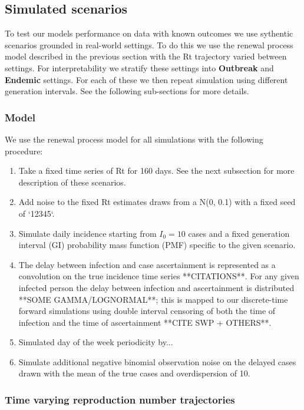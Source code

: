 \documentclass{getwriting}
\begin{document}
\subsection{Simulated scenarios}

To test our models performance on data with known outcomes we use sythentic scenarios grounded in real-world settings. To do this we use the renewal process model described in the previous section with the Rt trajectory varied between settings. For interpretability we stratify these settings into \textbf{Outbreak} and \textbf{Endemic} settings. For each of these we then repeat simulation using different generation intervals. See the following sub-sections for more details.

\subsubsection{Model}

We use the renewal process model for all simulations with the following procedure:

\begin{enumerate}
    \item Take a fixed time series of Rt for 160 days. See the next subsection for more description of these scenarios.
    \item Add noise to the fixed Rt estimates draws from a N(0, 0.1) with a fixed seed of `12345`.
    \item Simulate daily incidence starting from $I_0 = 10$ cases and a fixed generation interval (GI) probability mass function (PMF) specific to the given scenario.
    \item The delay between infection and case ascertainment is represented as a convolution on the true incidence time series **CITATIONS**. For any given infected person the delay between infection and ascertainment is distributed **SOME GAMMA/LOGNORMAL**; this is mapped to our discrete-time forward simulations using double interval censoring of both the time of infection and the time of ascertainment **CITE SWP + OTHERS**.
    \item Simulated day of the week periodicity by...
    \item Simulate additional negative binomial observation noise on the delayed cases drawn with the mean of the true cases and overdispersion of 10.
\end{enumerate}

\subsubsection{Time varying reproduction number trajectories}
\end{document}
